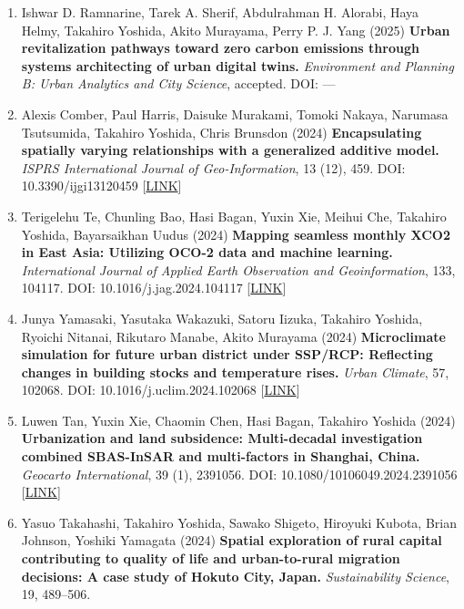\documentclass[
]{book}
\providecommand{\tightlist}{%
  \setlength{\itemsep}{0pt}\setlength{\parskip}{0pt}}
\begin{document}
\begin{enumerate}
\def\labelenumi{\arabic{enumi}.}
\tightlist
\item
  Ishwar D. Ramnarine, Tarek A. Sherif, Abdulrahman H. Alorabi, Haya Helmy, Takahiro Yoshida, Akito Murayama, Perry P. J. Yang (2025)
  \textbf{Urban revitalization pathways toward zero carbon emissions through systems architecting of urban digital twins.}
  \emph{Environment and Planning B: Urban Analytics and City Science}, accepted.
  DOI: ---
\item
  Alexis Comber, Paul Harris, Daisuke Murakami, Tomoki Nakaya, Narumasa Tsutsumida, Takahiro Yoshida, Chris Brunsdon (2024)
  \textbf{Encapsulating spatially varying relationships with a generalized additive model.}
  \emph{ISPRS International Journal of Geo-Information}, 13 (12), 459.
  DOI: 10.3390/ijgi13120459 {[}\href{https://doi.org/10.3390/ijgi13120459}{LINK}{]}
\item
  Terigelehu Te, Chunling Bao, Hasi Bagan, Yuxin Xie, Meihui Che, Takahiro Yoshida, Bayarsaikhan Uudus (2024)
  \textbf{Mapping seamless monthly XCO2 in East Asia: Utilizing OCO-2 data and machine learning.}
  \emph{International Journal of Applied Earth Observation and Geoinformation}, 133, 104117.
  DOI: 10.1016/j.jag.2024.104117 {[}\href{https://www.sciencedirect.com/science/article/pii/S1569843224004710}{LINK}{]}
\item
  Junya Yamasaki, Yasutaka Wakazuki, Satoru Iizuka, Takahiro Yoshida, Ryoichi Nitanai, Rikutaro Manabe, Akito Murayama (2024)
  \textbf{Microclimate simulation for future urban district under SSP/RCP: Reflecting changes in building stocks and temperature rises.}
  \emph{Urban Climate}, 57, 102068.
  DOI: 10.1016/j.uclim.2024.102068 {[}\href{https://www.sciencedirect.com/science/article/pii/S2212095524002645}{LINK}{]}
\item
  Luwen Tan, Yuxin Xie, Chaomin Chen, Hasi Bagan, Takahiro Yoshida (2024)
  \textbf{Urbanization and land subsidence: Multi-decadal investigation combined SBAS-InSAR and multi-factors in Shanghai, China.}
  \emph{Geocarto International}, 39 (1), 2391056.
  DOI: 10.1080/10106049.2024.2391056 {[}\href{https://www.tandfonline.com/doi/full/10.1080/10106049.2024.2391056}{LINK}{]}
\item
  Yasuo Takahashi, Takahiro Yoshida, Sawako Shigeto, Hiroyuki Kubota, Brian Johnson, Yoshiki Yamagata (2024)
  \textbf{Spatial exploration of rural capital contributing to quality of life and urban-to-rural migration decisions: A case study of Hokuto City, Japan.}
  \emph{Sustainability Science}, 19, 489--506.

\end{enumerate}
\end{document}

